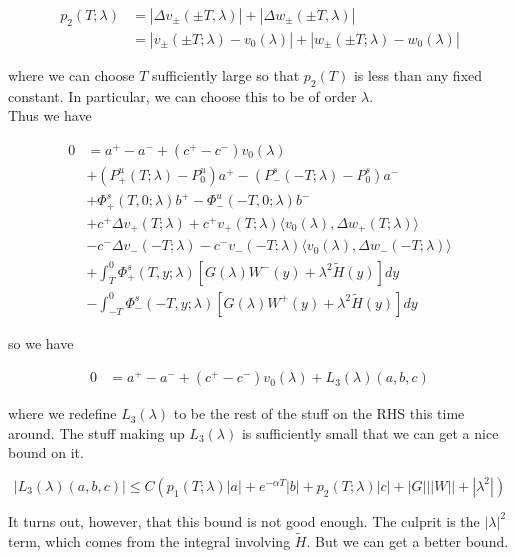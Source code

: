 \documentclass[12pt]{article}
\begin{document}
\begin{enumerate}
\begin{align*}
p_2(T; \lambda) &= |\Delta v_\pm(\pm T, \lambda)| + |\Delta w_\pm(\pm T, \lambda)|\\
&= |v_\pm(\pm T; \lambda) - v_0(\lambda)| + |w_\pm(\pm T; \lambda) - w_0(\lambda)|
\end{align*}

where we can choose $T$ sufficiently large so that $p_2(T)$ is less than any fixed constant. In particular, we can choose this to be of order $\lambda$.\\

Thus we have

\begin{align*}
0 &= a^+ - a^- + (c^+ - c^-)v_0(\lambda) \\
&+ (P^u_+(T; \lambda) - P_0^u)a^+ - (P^s_-(-T; \lambda) - P_0^s)a^- \\
&+ \Phi^s_+(T, 0; \lambda)b^+ - \Phi^u_-(-T, 0; \lambda)b^- \\
&+ c^+ \Delta v_+(T; \lambda) + c^+ v_+(T; \lambda) \langle v_0(\lambda), \Delta w_+(T; \lambda) \rangle \\
&- c^- \Delta v_-(-T; \lambda) - c^- v_-(-T; \lambda) \langle v_0(\lambda), \Delta w_-(-T; \lambda) \rangle \\
&+ \int_{T}^0 \Phi^s_+(T, y; \lambda) [ G(\lambda)W^-(y) + \lambda^2 \tilde{H}(y) ] dy \\
&- \int_{-T}^0 \Phi^s_-(-T, y; \lambda) [ G(\lambda)W^+(y) + \lambda^2 \tilde{H}(y) ] dy
\end{align*}

so we have

\begin{align*}
0 &= a^+ - a^- + (c^+ - c^-)v_0(\lambda) + L_3(\lambda)(a, b, c)
\end{align*}

where we redefine $L_3(\lambda)$ to be the rest of the stuff on the RHS this time around. The stuff making up $L_3(\lambda)$ is sufficiently small that we can get a nice bound on it. 

\[
|L_3(\lambda)(a, b, c)| \leq C ( p_1(T; \lambda)|a|
+ e^{-\alpha T}|b| + p_2(T; \lambda)|c| + |G|||W|| + |\lambda^2| )
\]

It turns out, however, that this bound is not good enough. The culprit is the $|\lambda|^2$ term, which comes from the integral involving $\tilde{H}$. But we can get a better bound.


\end{enumerate}
\end{document}
